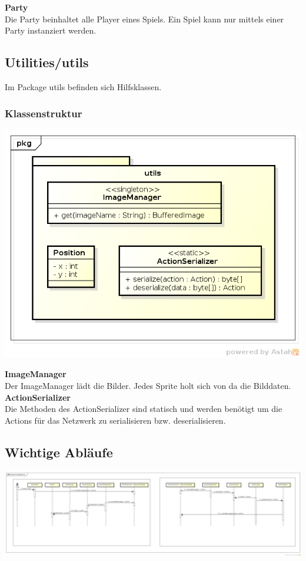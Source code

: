 \documentclass[11pt]{scrartcl}
\begin{document}
\textbf{Party}\\
Die Party beinhaltet alle Player eines Spiels. Ein Spiel kann nur mittels einer Party instanziert werden.

\newpage

\subsection{Utilities/utils}
Im Package utils befinden sich Hilfsklassen.
\subsubsection{Klassenstruktur}
\includegraphics[scale=0.75]{ClassDiagramUtils}

\textbf{ImageManager}\\
Der ImageManager lädt die Bilder. Jedes Sprite holt sich von da die Bilddaten.\\

\textbf{ActionSerializer}\\
Die Methoden des ActionSerializer sind statisch und werden benötigt um die Actions für das Netzwerk zu serialisieren bzw. deserialisieren.\\

\newpage

\subsection{Wichtige Abläufe}
\includegraphics[scale=0.25, angle=90]{SequenceDiagramAction}
\newpage
\end{document}
